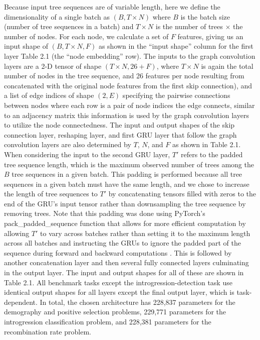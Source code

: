 Because input tree sequences are of variable length, here we define the dimensionality of a single batch as $(B, T\times N)$ where $B$ is the batch size (number of tree sequences in a batch) and $T \times N$ is the number of trees $\times$ the number of nodes. For each node, we calculate a set of $F$ features, giving us an input shape of $(B, T \times N, F)$ as shown in the “input shape” column for the first layer Table 2.1 (the “node embedding” row). The inputs to the graph convolution layers are a 2-D tensor of shape $(T \times N, 26+F)$, where $T\times N$ is again the total number of nodes in the tree sequence, and 26 features per node resulting from concatenated with the original node features from the first skip connection), and a list of edge indices of shape $(2, E)$ specifying the pairwise connections between nodes where each row is a pair of node indices the edge connects, similar to an adjacency matrix this information is used by the graph convolution layers to utilize the node connectedness. The input and output shapes of the skip connection layer, reshaping layer, and first GRU layer that follow the graph convolution layers are also determined by $T$, $N$, and $F$ as shown in Table 2.1. When considering the input to the second GRU layer, $T'$ refers to the padded tree sequence length, which is the maximum observed number of trees among the $B$ tree sequences in a given batch. This padding is performed because all tree sequences in a given batch must have the same length, and we chose to increase the length of tree sequences to $T'$ by concatenating tensors filled with zeros to the end of the GRU's input tensor rather than downsampling the tree sequence by removing trees. Note that this padding was done using PyTorch's pack\_padded\_sequence function that allows for more efficient computation by allowing $T'$ to vary across batches rather than setting it to the maximum length across all batches and instructing the GRUs to ignore the padded part of the sequence during forward and backward computations \cite{paszkePyTorchImperativeStyle2019}. This is followed by another concatenation layer and then several fully connected layers culminating in the output layer. The input and output shapes for all of these are shown in Table 2.1. All benchmark tasks except the introgression-detection task use identical output shapes for all layers except the final output layer, which is task-dependent. In total, the chosen architecture has 228,837 parameters for the demography and positive selection problems, 229,771 parameters for the introgression classification problem, and 228,381 parameters for the recombination rate problem.

